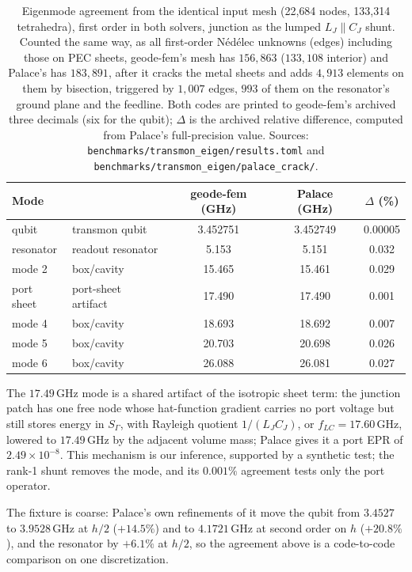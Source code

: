 \documentclass{anvil-paper}
\begin{document}
\begin{table}[htbp]
  \centering
  \caption{Eigenmode agreement from the identical input mesh (22{,}684
  nodes, 133{,}314 tetrahedra), first order in both solvers, junction as
  the lumped $L_J \parallel C_J$ shunt. Counted the same way, as all
  first-order N\'ed\'elec unknowns (edges) including those on PEC sheets,
  geode-fem's mesh has $156{,}863$ ($133{,}108$ interior) and Palace's has
  $183{,}891$, after it cracks the metal sheets and adds $4{,}913$ elements
  on them by bisection, triggered by $1{,}007$ edges, $993$ of them on
  the resonator's ground plane and the feedline. Both
  codes are printed to geode-fem's archived three decimals (six for the
  qubit); $\Delta$ is the archived relative difference, computed from
  Palace's full-precision value. Sources:
  \texttt{benchmarks/transmon\_eigen/results.toml} and
  \texttt{benchmarks/transmon\_eigen/palace\_crack/}.}
  \label{tab:agreement}
  \footnotesize
  \begin{tabular}{@{}llccc@{}}
    \toprule
    Mode & & geode-fem (GHz) & Palace (GHz) & $\Delta$ (\%) \\
    \midrule
    qubit & transmon qubit & 3.452751 & 3.452749 & 0.00005 \\
    resonator & readout resonator & 5.153 & 5.151 & 0.032 \\
    mode 2 & box/cavity & 15.465 & 15.461 & 0.029 \\
    port sheet & port-sheet artifact & 17.490 & 17.490 & 0.001 \\
    mode 4 & box/cavity & 18.693 & 18.692 & 0.007 \\
    mode 5 & box/cavity & 20.703 & 20.698 & 0.026 \\
    mode 6 & box/cavity & 26.088 & 26.081 & 0.027 \\
    \bottomrule
  \end{tabular}
\end{table}

The $17.49$\,GHz mode is a shared artifact of the isotropic sheet term:
the junction patch has one free node whose hat-function gradient carries no
port voltage but still stores energy in $S_\Gamma$, with Rayleigh quotient
$1/(L_JC_J)$, or $f_{LC} = 17.60$\,GHz, lowered to $17.49$\,GHz by the
adjacent volume mass; Palace gives it a port EPR of $2.49\times10^{-8}$.
This mechanism is our inference, supported by a synthetic test; the rank-1
shunt removes the mode, and its $0.001\%$ agreement tests only the port
operator.

The fixture is coarse: Palace's own refinements of it move the qubit from
$3.4527$ to $3.9528$\,GHz at $h/2$ ($+14.5\%$) and to $4.1721$\,GHz at
second order on $h$ ($+20.8\%$), and the resonator by $+6.1\%$ at $h/2$, so
the agreement above is a code-to-code comparison on one discretization.
\end{document}
